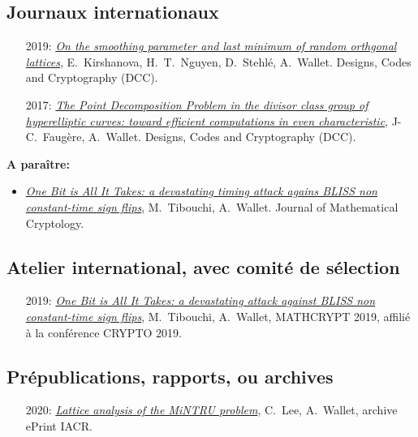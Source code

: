 \documentclass[11pt]{article}
\begin{document}
\subsection*{Journaux internationaux}

\begin{itemize}
    \item[2019:]   \href{https://eprint.iacr.org/2020/057.pdf}{\em On the smoothing parameter and last minimum of random orthgonal lattices}, E.~Kirshanova, H.~T.~Nguyen, D.~Stehlé, A.~Wallet.
    Designs, Codes and Cryptography (DCC).

  \item[2017:]  \href{https://awallet.github.io/images/HyperSum.pdf}{\em The Point Decomposition Problem in the divisor class group of hyperelliptic curves: toward efficient computations in even characteristic}, J-C.~Faugère, A.~Wallet. Designs, Codes and Cryptography (DCC).
\end{itemize}
  
\noindent\textbf{A paraître:}
  \begin{itemize}[label=$\bullet$]
  \item   \href{https://eprint.iacr.org/2019/898.pdf}{\em One Bit is All It Takes: a devastating timing attack agains BLISS non constant-time sign flips}, M.~Tibouchi, A.~Wallet. Journal of Mathematical Cryptology.
    \end{itemize}
  

\subsection*{Atelier international, avec comité de sélection}

\begin{itemize}
\item[2019:] \href{https://eprint.iacr.org/2019/898.pdf}{\em One Bit is All It Takes: a devastating attack against BLISS non constant-time sign flips}, M.~Tibouchi, A.~Wallet, MATHCRYPT 2019, affilié à la conférence CRYPTO 2019.
\end{itemize}


\subsection*{Prépublications, rapports, ou  archives}

\begin{itemize}[label=$\bullet$]
\item[2020:] \href{https://eprint.iacr.org/2020/230}{\em Lattice analysis of the MiNTRU problem}, C.~Lee, A.~Wallet, archive ePrint IACR.
\end{itemize}
\end{document}
